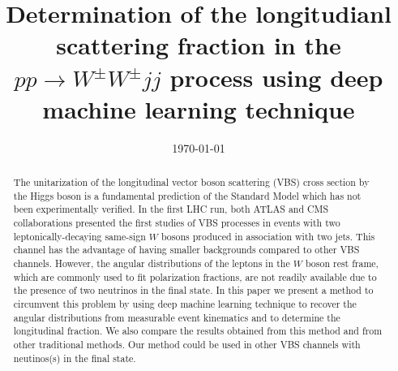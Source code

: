 \documentclass[aps,prd,twocolumn,showpacs,superscriptaddress,groupedaddress]{revtex4}  %
\begin{document}
\title{Determination of the longitudianl scattering fraction in the $pp \rightarrow W^\pm W^\pm jj$ process using deep machine learning technique}
\author{}
\date{\today}

\begin{abstract}
The unitarization of the longitudinal vector boson scattering (VBS) cross section by the Higgs boson is 
a fundamental prediction of the Standard Model which has not been experimentally verified. In the first LHC run, 
both ATLAS and CMS collaborations presented the first studies of VBS processes in events with two leptonically-decaying same-sign 
$W$ bosons produced in association with two jets. This channel has the advantage of having smaller backgrounds 
compared to other VBS channels. 
However, the angular distributions of the leptons in the $W$ boson rest frame, which are commonly used to 
fit polarization fractions, are not readily available due to the presence of two neutrinos in the final state. 
In this paper we present a method to circumvent this problem by using deep machine learning technique to 
recover the angular distributions from measurable event kinematics and to determine the longitudinal fraction. 
We also compare the results obtained from this method and from other traditional methods. Our method could be 
used in other VBS channels with neutinos(s) in the final state. 
\end{abstract}

\maketitle


\end{document}

